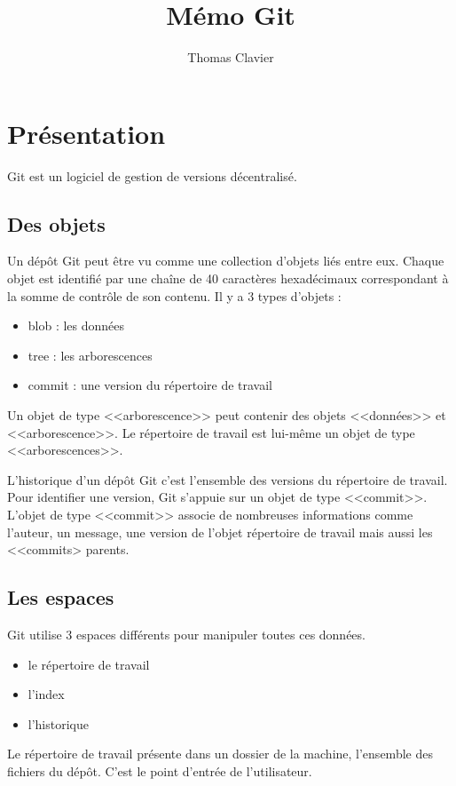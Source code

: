 \documentclass[a4paper]{article}
\title{Mémo Git}
\author{Thomas Clavier}
\date{}
\begin{document}
\maketitle

\section*{Présentation}

Git est un logiciel de gestion de versions décentralisé.

\subsection*{Des objets}
Un dépôt Git peut être vu comme une collection d’objets liés entre eux. 
Chaque objet est identifié par une chaîne de 40 caractères hexadécimaux
correspondant à la somme de contrôle de son contenu. 
Il y a 3 types d'objets : 
\begin{itemize}
\item blob : les données
\item tree : les arborescences
\item commit : une version du répertoire de travail
\end{itemize}
Un objet de type <<arborescence>> peut contenir des objets <<données>> et <<arborescence>>.
Le répertoire de travail est lui-même un objet de type <<arborescences>>. 

L'historique d'un dépôt Git c'est l'ensemble des versions du répertoire de travail. Pour identifier une version, Git s'appuie sur un objet de type <<commit>>. 
L'objet de type <<commit>> associe de nombreuses informations comme l'auteur, un message, une version de l'objet répertoire de travail mais aussi les <<commits> parents.


\subsection*{Les espaces}
Git utilise 3 espaces différents pour manipuler toutes ces données.
\begin{itemize}
\item le répertoire de travail
\item l'index
\item l'historique
\end{itemize}

Le répertoire de travail présente dans un dossier de la machine, l'ensemble des fichiers du dépôt. C'est le point d'entrée de l'utilisateur.
\end{document}
